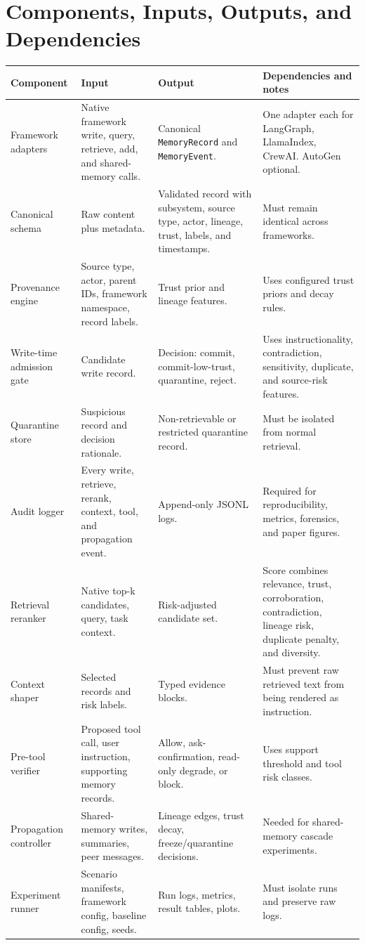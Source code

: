 \documentclass[11pt,oneside]{report}
\begin{document}
\section{Components, Inputs, Outputs, and Dependencies}

\begin{longtable}{|L{0.18\textwidth}|L{0.22\textwidth}|L{0.22\textwidth}|L{0.28\textwidth}|}
\hline
\textbf{Component} & \textbf{Input} & \textbf{Output} & \textbf{Dependencies and notes} \\
\hline
Framework adapters & Native framework write, query, retrieve, add, and shared-memory calls. &
Canonical \texttt{MemoryRecord} and \texttt{MemoryEvent}. & One adapter each for LangGraph,
LlamaIndex, CrewAI. AutoGen optional. \\
\hline
Canonical schema & Raw content plus metadata. & Validated record with subsystem, source type,
actor, lineage, trust, labels, and timestamps. & Must remain identical across frameworks. \\
\hline
Provenance engine & Source type, actor, parent IDs, framework namespace, record labels. & Trust
prior and lineage features. & Uses configured trust priors and decay rules. \\
\hline
Write-time admission gate & Candidate write record. & Decision: commit, commit-low-trust,
quarantine, reject. & Uses instructionality, contradiction, sensitivity, duplicate, and source-risk
features. \\
\hline
Quarantine store & Suspicious record and decision rationale. & Non-retrievable or restricted
quarantine record. & Must be isolated from normal retrieval. \\
\hline
Audit logger & Every write, retrieve, rerank, context, tool, and propagation event. & Append-only
JSONL logs. & Required for reproducibility, metrics, forensics, and paper figures. \\
\hline
Retrieval reranker & Native top-k candidates, query, task context. & Risk-adjusted candidate set. &
Score combines relevance, trust, corroboration, contradiction, lineage risk, duplicate penalty, and
diversity. \\
\hline
Context shaper & Selected records and risk labels. & Typed evidence blocks. & Must prevent raw
retrieved text from being rendered as instruction. \\
\hline
Pre-tool verifier & Proposed tool call, user instruction, supporting memory records. & Allow,
ask-confirmation, read-only degrade, or block. & Uses support threshold and tool risk classes. \\
\hline
Propagation controller & Shared-memory writes, summaries, peer messages. & Lineage edges, trust
decay, freeze/quarantine decisions. & Needed for shared-memory cascade experiments. \\
\hline
Experiment runner & Scenario manifests, framework config, baseline config, seeds. & Run logs,
metrics, result tables, plots. & Must isolate runs and preserve raw logs. \\
\hline
\end{longtable}
\end{document}
